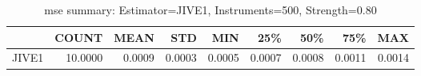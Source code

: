\begin{table}[ht]
\centering
\caption{mse summary: Estimator=JIVE1, Instruments=500, Strength=0.80}
\begin{tabular}{lrrrrrrrr}
\toprule
 & COUNT & MEAN & STD & MIN & 25\% & 50\% & 75\% & MAX \\
\midrule
JIVE1 & 10.0000 & 0.0009 & 0.0003 & 0.0005 & 0.0007 & 0.0008 & 0.0011 & 0.0014 \\
\bottomrule
\end{tabular}
\end{table}

